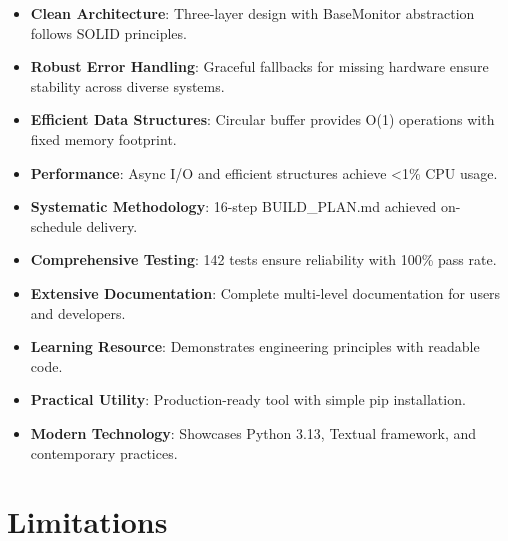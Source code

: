 \documentclass[12pt,a4paper,oneside]{report}
\begin{document}
\begin{itemize}
    \item \textbf{Clean Architecture}: Three-layer design with BaseMonitor abstraction follows SOLID principles.
    
    \item \textbf{Robust Error Handling}: Graceful fallbacks for missing hardware ensure stability across diverse systems.
    
    \item \textbf{Efficient Data Structures}: Circular buffer provides O(1) operations with fixed memory footprint.
    
    \item \textbf{Performance}: Async I/O and efficient structures achieve <1\% CPU usage.
    
    \item \textbf{Systematic Methodology}: 16-step BUILD\_PLAN.md achieved on-schedule delivery.
    
    \item \textbf{Comprehensive Testing}: 142 tests ensure reliability with 100\% pass rate.
    
    \item \textbf{Extensive Documentation}: Complete multi-level documentation for users and developers.
    
    \item \textbf{Learning Resource}: Demonstrates engineering principles with readable code.
    
    \item \textbf{Practical Utility}: Production-ready tool with simple pip installation.
    
    \item \textbf{Modern Technology}: Showcases Python 3.13, Textual framework, and contemporary practices.
\end{itemize}

\section{Limitations}
\label{sec:limitations}
\end{document}
